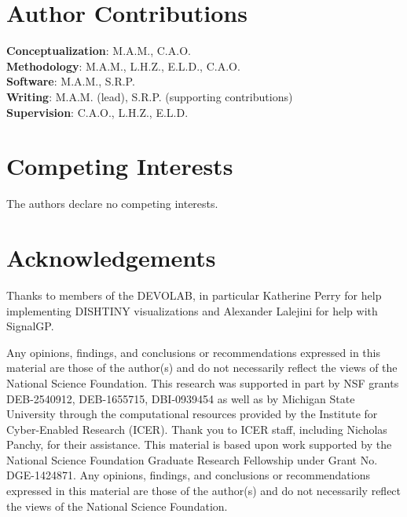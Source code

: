 \section*{Author Contributions}

\textbf{Conceptualization}: M.A.M., C.A.O. \\
\textbf{Methodology}: M.A.M., L.H.Z., E.L.D., C.A.O. \\
\textbf{Software}: M.A.M., S.R.P. \\
\textbf{Writing}: M.A.M. (lead), S.R.P. (supporting contributions) \\
\textbf{Supervision}: C.A.O., L.H.Z., E.L.D.

\section*{Competing Interests}

The authors declare no competing interests.





\section*{Acknowledgements}

Thanks to members of the DEVOLAB, in particular Katherine Perry for help implementing DISHTINY visualizations and Alexander Lalejini for help with SignalGP.

Any opinions, findings, and conclusions or recommendations expressed in this material are those of the author(s) and do not necessarily reflect the views of the National Science Foundation.
This research was supported in part by NSF grants DEB-2540912, DEB-1655715, DBI-0939454 as well as by Michigan State University through the computational resources provided by the Institute for Cyber-Enabled Research (ICER).
Thank you to ICER staff, including Nicholas Panchy, for their assistance.
This material is based upon work supported by the National Science Foundation Graduate Research Fellowship under Grant No. DGE-1424871.
Any opinions, findings, and conclusions or recommendations expressed in this material are those of the author(s) and do not necessarily reflect the views of the National Science Foundation.

